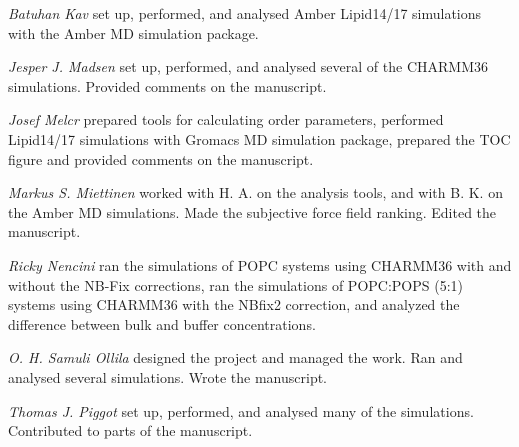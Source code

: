 \documentclass[journal=jpcbfk,manuscript=article]{achemso}
\begin{document}
\noindent
{\it Batuhan Kav}
set up, performed, and analysed Amber Lipid14/17 simulations with the Amber MD simulation package.

\noindent
{\it Jesper J. Madsen}
set up, performed, and analysed several of the CHARMM36 simulations. Provided comments on the manuscript.

\noindent
{\it Josef Melcr}
prepared tools for calculating order parameters, performed Lipid14/17 simulations with Gromacs MD simulation package,
prepared the TOC figure and provided comments on the manuscript.

\noindent
{\it Markus S. Miettinen}
worked with
H. A. on the analysis tools, and with
B. K. on the Amber MD simulations.
Made the subjective force field ranking.
Edited the manuscript.

\noindent
{\it Ricky Nencini}
ran the simulations of POPC systems using CHARMM36 with and without the NB-Fix corrections,
ran the simulations of POPC:POPS (5:1) systems using CHARMM36 with the NBfix2 correction,
and analyzed the difference between bulk and buffer concentrations. 


\noindent
{\it O. H. Samuli Ollila}
designed the project and managed the work.
Ran and analysed several simulations. Wrote the manuscript.

\noindent
{\it Thomas J. Piggot}
set up, performed, and analysed many of the simulations. Contributed to parts of the manuscript.

\clearpage

\end{document}
